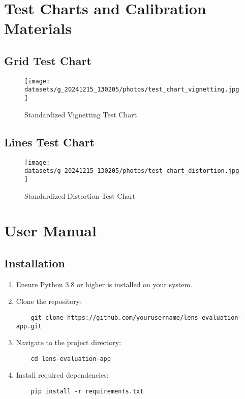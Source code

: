 
\chapter{Test Charts and Calibration Materials}
\label{app:test_charts}

\section{Grid Test Chart}
\label{app:vignetting_chart}
\begin{figure}[H]
    \centering
    \texttt{[image: datasets/g\_20241215\_130205/photos/test\_chart\_vignetting.jpg]}
    \caption{Standardized Vignetting Test Chart}
    \label{fig:vignetting_chart}
\end{figure}

\section{Lines Test Chart}
\label{app:distortion_chart}
\begin{figure}[H]
    \centering
    \texttt{[image: datasets/g\_20241215\_130205/photos/test\_chart\_distortion.jpg]}
    \caption{Standardized Distortion Test Chart}
    \label{fig:distortion_chart}
\end{figure}


\chapter{User Manual}
\label{app:user_manual}

\section{Installation}
\begin{enumerate}
    \item Ensure Python 3.8 or higher is installed on your system.
    \item Clone the repository:
    \begin{verbatim}
    git clone https://github.com/yourusername/lens-evaluation-app.git
    \end{verbatim}
    \item Navigate to the project directory:
    \begin{verbatim}
    cd lens-evaluation-app
    \end{verbatim}
    \item Install required dependencies:
    \begin{verbatim}
    pip install -r requirements.txt
    \end{verbatim}
\end{enumerate}

